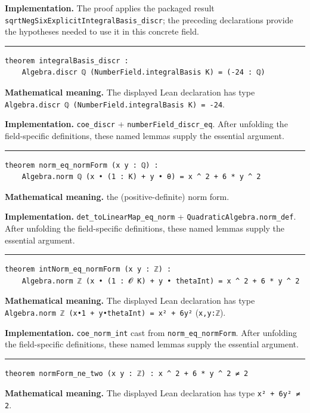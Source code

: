 \documentclass[UTF8,a4paper,11pt,fontset=fandol]{ctexart}
\theoremstyle{definition}
\newcommand{\statementsep}{\par\medskip\hrule\medskip}
\begin{document}
\noindent\textbf{Implementation.} The proof applies the packaged result \texttt{sqrtNegSixExplicitIntegralBasis\_\allowbreak{}discr}; the preceding declarations provide the hypotheses needed to use it in this concrete field.\par
\statementsep
\begin{verbatim}
theorem integralBasis_discr :
    Algebra.discr ℚ (NumberField.integralBasis K) = (-24 : ℚ)
\end{verbatim}
\noindent\textbf{Mathematical meaning.} The displayed Lean declaration has type \texttt{Algebra.\allowbreak{}discr ℚ (NumberField.\allowbreak{}integralBasis K) = -24}.\par
\noindent\textbf{Implementation.} \texttt{coe\_\allowbreak{}discr} + \texttt{numberField\_\allowbreak{}discr\_\allowbreak{}eq}. After unfolding the field-specific definitions, these named lemmas supply the essential argument.\par
\statementsep
\begin{verbatim}
theorem norm_eq_normForm (x y : ℚ) :
    Algebra.norm ℚ (x • (1 : K) + y • θ) = x ^ 2 + 6 * y ^ 2
\end{verbatim}
\noindent\textbf{Mathematical meaning.} the (positive-definite) norm form.\par
\noindent\textbf{Implementation.} \texttt{det\_\allowbreak{}toLinearMap\_\allowbreak{}eq\_\allowbreak{}norm} + \texttt{QuadraticAlgebra.\allowbreak{}norm\_\allowbreak{}def}. After unfolding the field-specific definitions, these named lemmas supply the essential argument.\par
\statementsep
\begin{verbatim}
theorem intNorm_eq_normForm (x y : ℤ) :
    Algebra.norm ℤ (x • (1 : 𝓞 K) + y • thetaInt) = x ^ 2 + 6 * y ^ 2
\end{verbatim}
\noindent\textbf{Mathematical meaning.} The displayed Lean declaration has type \texttt{Algebra.\allowbreak{}norm ℤ (x•1 + y•thetaInt) = x² + 6y²} (\texttt{x,y:ℤ}).\par
\noindent\textbf{Implementation.} \texttt{coe\_\allowbreak{}norm\_\allowbreak{}int} cast from \texttt{norm\_\allowbreak{}eq\_\allowbreak{}normForm}. After unfolding the field-specific definitions, these named lemmas supply the essential argument.\par
\statementsep
\begin{verbatim}
theorem normForm_ne_two (x y : ℤ) : x ^ 2 + 6 * y ^ 2 ≠ 2
\end{verbatim}
\noindent\textbf{Mathematical meaning.} The displayed Lean declaration has type \texttt{x² + 6y² ≠ 2}.\par
\end{document}
